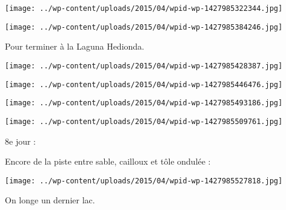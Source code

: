  

\begin{center} \texttt{[image: ../wp-content/uploads/2015/04/wpid-wp-1427985322344.jpg]} \end{center}



 

\begin{center} \texttt{[image: ../wp-content/uploads/2015/04/wpid-wp-1427985384246.jpg]} \end{center}



 Pour terminer à la Laguna Hedionda.

 

\begin{center} \texttt{[image: ../wp-content/uploads/2015/04/wpid-wp-1427985428387.jpg]} \end{center}



 

\begin{center} \texttt{[image: ../wp-content/uploads/2015/04/wpid-wp-1427985446476.jpg]} \end{center}



 

\begin{center} \texttt{[image: ../wp-content/uploads/2015/04/wpid-wp-1427985493186.jpg]} \end{center}



 

\begin{center} \texttt{[image: ../wp-content/uploads/2015/04/wpid-wp-1427985509761.jpg]} \end{center}



 8e jour : 

 Encore de la piste entre sable, cailloux et tôle ondulée :

 

\begin{center} \texttt{[image: ../wp-content/uploads/2015/04/wpid-wp-1427985527818.jpg]} \end{center}



 On longe un dernier lac.

 

